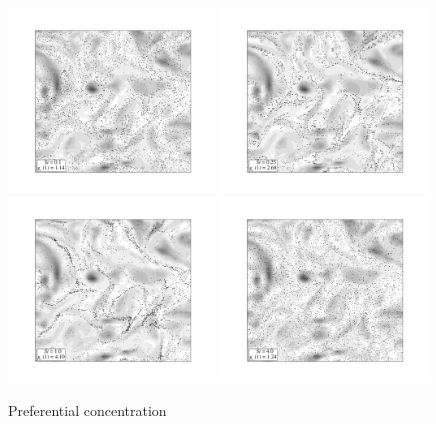 \documentclass[../thesis.tex]{subfiles}
\begin{document}
\begin{figure}
\center
\includegraphics[trim=27mm 20mm 25mm 21mm, clip, width=0.49\textwidth]{../figs/Pref-conc/St = 0.1.pdf}
\includegraphics[trim=27mm 20mm 25mm 21mm, clip, width=0.49\textwidth]{../figs/Pref-conc/St = 0.25.pdf}
\includegraphics[trim=27mm 20mm 25mm 21mm, clip, width=0.49\textwidth]{../figs/Pref-conc/St = 1.pdf}
\includegraphics[trim=27mm 20mm 25mm 21mm, clip, width=0.49\textwidth]{../figs/Pref-conc/St = 4.pdf}
\caption{Preferential concentration}
\label{fig:pref}
\end{figure}

%
%
\newpage
\end{document}
